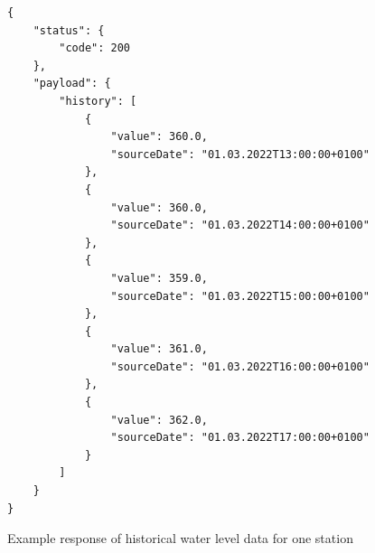 \begin{listing}
\begin{verbatim}
{
    "status": {
        "code": 200
    },
    "payload": {
        "history": [
            {
                "value": 360.0,
                "sourceDate": "01.03.2022T13:00:00+0100"
            },
            {
                "value": 360.0,
                "sourceDate": "01.03.2022T14:00:00+0100"
            },
            {
                "value": 359.0,
                "sourceDate": "01.03.2022T15:00:00+0100"
            },
            {
                "value": 361.0,
                "sourceDate": "01.03.2022T16:00:00+0100"
            },
            {
                "value": 362.0,
                "sourceDate": "01.03.2022T17:00:00+0100"
            }
        ]
    }
}
\end{verbatim}
\caption{Example response of historical water level data for one station}
\label{listing:water-level-data-response}
\end{listing}

